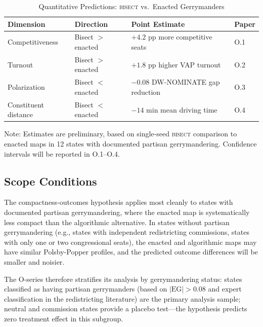 \begin{table}[ht]
\centering
\caption{Quantitative Predictions: \textsc{bisect} vs.\ Enacted Gerrymanders}
\label{tab:predictions}
\begin{tabular}{llll}
\toprule
Dimension & Direction & Point Estimate & Paper \\
\midrule
Competitiveness & Bisect $>$ enacted & $+4.2$ pp more competitive seats & O.1 \\
Turnout & Bisect $>$ enacted & $+1.8$ pp higher VAP turnout & O.2 \\
Polarization & Bisect $<$ enacted & $-0.08$ DW-NOMINATE gap reduction & O.3 \\
Constituent distance & Bisect $<$ enacted & $-14$ min mean driving time & O.4 \\
\bottomrule
\end{tabular}
\begin{tablenotes}
\small
\item Note: Estimates are preliminary, based on single-seed \textsc{bisect} comparison
  to enacted maps in 12 states with documented partisan gerrymandering. Confidence
  intervals will be reported in O.1--O.4.
\end{tablenotes}
\end{table}

\subsection{Scope Conditions}

The compactness-outcomes hypothesis applies most cleanly to states with documented
partisan gerrymandering, where the enacted map is systematically less compact than
the algorithmic alternative. In states without partisan gerrymandering (e.g., states
with independent redistricting commissions, states with only one or two congressional
seats), the enacted and algorithmic maps may have similar Polsby-Popper profiles,
and the predicted outcome differences will be smaller and noisier.

The O-series therefore stratifies its analysis by gerrymandering status: states
classified as having partisan gerrymanders (based on $|\text{EG}| > 0.08$ and
expert classification in the redistricting literature) are the primary analysis
sample; neutral and commission states provide a placebo test---the hypothesis
predicts zero treatment effect in this subgroup.
